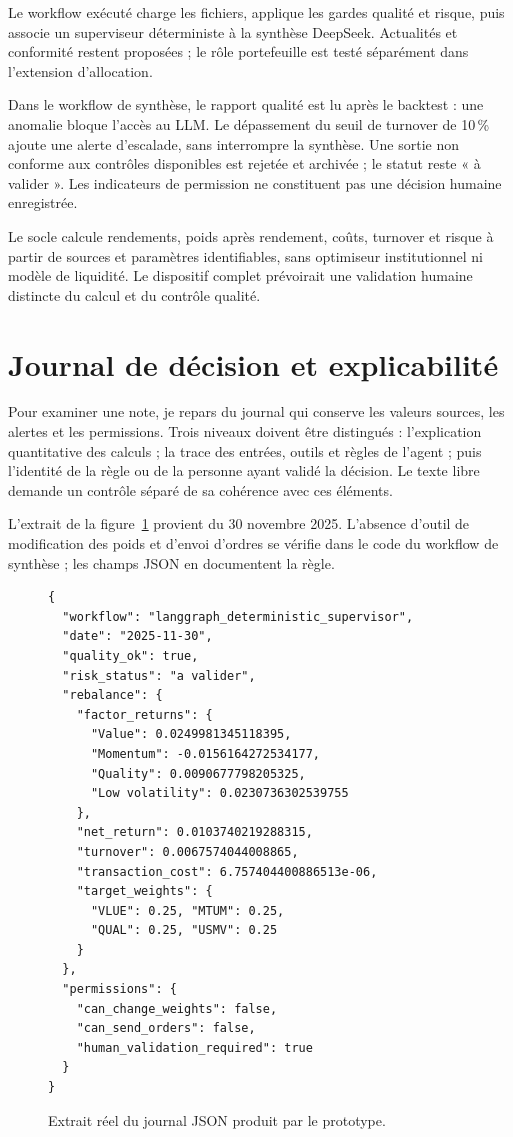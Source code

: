 Le workflow exécuté charge les fichiers, applique les gardes qualité et risque, puis associe un superviseur déterministe à la synthèse DeepSeek. Actualités et conformité restent proposées ; le rôle portefeuille est testé séparément dans l'extension d'allocation.

Dans le workflow de synthèse, le rapport qualité est lu après le backtest : une anomalie bloque l'accès au LLM. Le dépassement du seuil de turnover de 10\,\% ajoute une alerte d'escalade, sans interrompre la synthèse. Une sortie non conforme aux contrôles disponibles est rejetée et archivée ; le statut reste « à valider ». Les indicateurs de permission ne constituent pas une décision humaine enregistrée.

Le socle calcule rendements, poids après rendement, coûts, turnover et risque à partir de sources et paramètres identifiables, sans optimiseur institutionnel ni modèle de liquidité. Le dispositif complet prévoirait une validation humaine distincte du calcul et du contrôle qualité.

\section{Journal de décision et explicabilité}

Pour examiner une note, je repars du journal qui conserve les valeurs sources, les alertes et les permissions. Trois niveaux doivent être distingués : l'explication quantitative des calculs ; la trace des entrées, outils et règles de l'agent ; puis l'identité de la règle ou de la personne ayant validé la décision. Le texte libre demande un contrôle séparé de sa cohérence avec ces éléments.

L'extrait de la figure~\ref{fig:json-decision} provient du 30 novembre 2025. L'absence d'outil de modification des poids et d'envoi d'ordres se vérifie dans le code du workflow de synthèse ; les champs JSON en documentent la règle.

\begin{figure}[H]
\centering
\scriptsize
\begin{verbatim}
{
  "workflow": "langgraph_deterministic_supervisor",
  "date": "2025-11-30",
  "quality_ok": true,
  "risk_status": "a valider",
  "rebalance": {
    "factor_returns": {
      "Value": 0.0249981345118395,
      "Momentum": -0.0156164272534177,
      "Quality": 0.0090677798205325,
      "Low volatility": 0.0230736302539755
    },
    "net_return": 0.0103740219288315,
    "turnover": 0.0067574044008865,
    "transaction_cost": 6.757404400886513e-06,
    "target_weights": {
      "VLUE": 0.25, "MTUM": 0.25,
      "QUAL": 0.25, "USMV": 0.25
    }
  },
  "permissions": {
    "can_change_weights": false,
    "can_send_orders": false,
    "human_validation_required": true
  }
}
\end{verbatim}
\caption{Extrait réel du journal JSON produit par le prototype.}
\label{fig:json-decision}
\end{figure}

